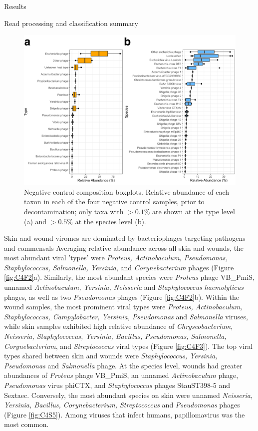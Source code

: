 \documentclass[oneside,12pt,final]{sty/ucthesis-CA2012}
\begin{document}
\begin{mainmatter}
\begin{section}{Results}
\begin{subsection}{Read processing and classification summary}
\begin{figure}[h]
\centering
\centerline{\includegraphics[width=\textwidth]{fig/C4fig1.pdf}}
\caption{Negative control composition boxplots. Relative abundance of each taxon in each of the four negative control samples, prior to decontamination; only taxa with $>0.1\%$ are shown at the type level (a) and $>0.5\%$ at the species level (b).}
\label{fig:C4F1}
\end{figure}
\end{subsection}

\begin{subsection}{Skin and wound viromes are dominated by bacteriophages targeting pathogens and commensals}
Averaging relative abundance across all skin and wounds, the most abundant viral 'types' were \textit{Proteus, Actinobaculum, Pseudomonas, Staphylococcus, Salmonella, Yersinia}, and \textit{Corynebacterium} phages (Figure \ref{fig:C4F2}a). Similarly, the most abundant species were \textit{Proteus} phage VB\_PmiS, unnamed \textit{Actinobaculum, Yersinia, Neisseria} and \textit{Staphylococcus haemolyticus} phages, as well as two \textit{Pseudomonas} phages (Figure \ref{fig:C4F2}b). Within the wound samples, the most prominent viral types were \textit{Proteus, Actinobaculum, Staphylococcus, Campylobacter, Yersinia, Pseudomonas} and \textit{Salmonella} viruses, while skin samples exhibited high relative abundance of \textit{Chryseobacterium, Neisseria, Staphylococcus, Yersinia, Bacillus, Pseudomonas, Salmonella, Corynebacterium}, and \textit{Streptococcus} viral types (Figure \ref{fig:C4F3}). The top viral types shared between skin and wounds were \textit{Staphylococcus, Yersinia, Pseudomonas} and \textit{Salmonella} phage. At the species level, wounds had greater abundances of \textit{Proteus} phage VB\_PmiS, an unnamed \textit{Actinobaculum} phage, \textit{Pseudomonas} virus phiCTX, and \textit{Staphylococcus} phages StauST398-5 and Sextaec. Conversely, the most abundant species on skin were unnamed \textit{Neisseria, Yersinia, Bacillus, Corynebacterium, Streptococcus} and \textit{Pseudomonas} phages (Figure \ref{fig:C4S5}). Among viruses that infect humans, papillomavirus was the most common.


\end{subsection}
\end{section}
\end{mainmatter}
\end{document}
